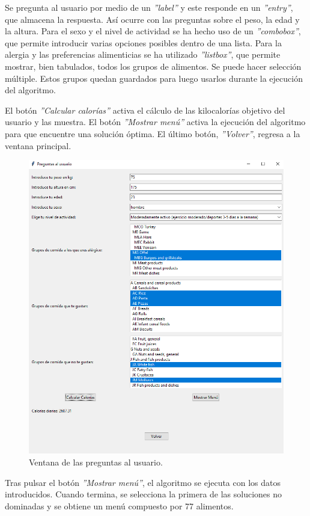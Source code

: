 Se pregunta al usuario por medio de un \textit{''label''} y este responde en un \textit{''entry''}, que almacena la respuesta. Así ocurre con las preguntas sobre el peso, la edad y la altura. Para el sexo y el nivel de actividad se ha hecho uso de un \textit{''combobox''}, que permite introducir varias opciones posibles dentro de una lista. Para la alergia y las preferencias alimenticias se ha utilizado \textit{''listbox''}, que permite mostrar, bien tabulados, todos los grupos de alimentos. Se puede hacer selección múltiple. Estos grupos quedan guardados para luego usarlos durante la ejecución del algoritmo.

El botón \textit{''Calcular calorías''} activa el cálculo de las kilocalorías objetivo del usuario y las muestra. El botón \textit{''Mostrar menú''} activa la ejecución del algoritmo para que encuentre una solución óptima. El último botón, \textit{''Volver''}, regresa a la ventana principal.

\begin{figure}[H]
    \centering
    \includegraphics[width=1\textwidth]{figures/ventana-preguntasusuario.png}
    \caption{Ventana de las preguntas al usuario.}
    \label{fig:ventana-usuario}
\end{figure}
\newpage
Tras pulsar el botón \textit{''Mostrar menú''}, el algoritmo se ejecuta con los datos introducidos. Cuando termina, se selecciona la primera de las soluciones no dominadas y se obtiene un menú compuesto por 77 alimentos.

